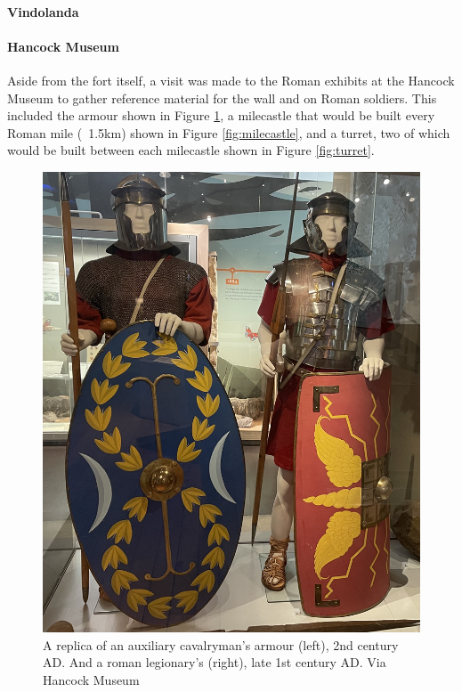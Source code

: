 \documentclass[sigconf,authordraft]{acmart}
\begin{document}
\paragraph{Vindolanda}

\paragraph{Hancock Museum}

Aside from the fort itself, a visit was made to the Roman exhibits at the
Hancock Museum to gather reference material for the wall and on Roman soldiers.
This included the armour shown in Figure \ref{fig:armour}, a milecastle that
would be built every Roman mile (~1.5km) \cite[p.1027]{smith_new_1851} shown in
Figure \ref{fig:milecastle}, and a turret, two of which would be built between
each milecastle shown in Figure \ref{fig:turret}.

\begin{figure}
  \includegraphics[width=0.8\linewidth]{armour.jpg}
  \caption{\label{fig:armour} A replica of an auxiliary cavalryman's armour
    (left), 2nd century AD. And a roman legionary's (right), late 1st
    century AD.
  Via Hancock Museum}
\end{figure}
\end{document}
